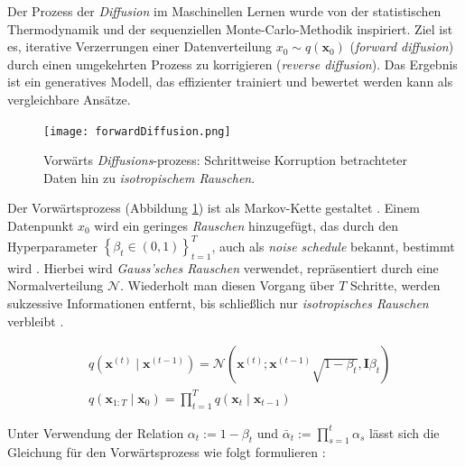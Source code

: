\documentclass[
  a4paper,  %
  twoside,  %
  bibliography=totoc,
  headsepline,
  cleardoublepage=empty,
  parskip=half,
  draft=false
]{scrbook}
\begin{document}
Der Prozess der \emph{Diffusion} im Maschinellen Lernen \cite{sohl-dickstein_deep_2015, ho_denoising_2020, nichol_improved_2021, dhariwal_diffusion_2021} wurde von der statistischen Thermodynamik \cite{jarzynski_equilibrium_1997} und der sequenziellen Monte-Carlo-Methodik \cite{neal_annealed_1998} inspiriert. Ziel ist es, iterative Verzerrungen einer Datenverteilung $x_0\sim q(\mathbf{x}_0)$ (\emph{forward diffusion}) durch einen umgekehrten Prozess zu korrigieren (\emph{reverse diffusion}). Das Ergebnis ist ein generatives Modell, das effizienter trainiert und bewertet werden kann als vergleichbare Ansätze. \cite{sohl-dickstein_deep_2015, nichol_improved_2021}

\begin{figure}[h]
  \centering
  \texttt{[image: forwardDiffusion.png]}
  \caption[Vorwärtsprozess Diffusion]{Vorwärts \emph{Diffusions}-prozess: Schrittweise Korruption betrachteter Daten hin zu \emph{isotropischem Rauschen}. \cite{machine_learning_at_berkeley_diffusion_2022}}
  \label{fig:forwardDiffusion}
\end{figure} 

Der Vorwärtsprozess (Abbildung \ref{fig:forwardDiffusion}) ist als Markov-Kette gestaltet \cite{sohl-dickstein_deep_2015, ho_denoising_2020}. Einem Datenpunkt $x_0$ wird ein geringes \emph{Rauschen} hinzugefügt, das durch den Hyperparameter $\left\{\beta_t \in(0,1)\right\}_{t=1}^T$, auch als \emph{noise schedule} bekannt, bestimmt wird \cite{ho_denoising_2020, machine_learning_at_berkeley_diffusion_2022}. Hierbei wird \emph{Gauss'sches Rauschen} \cite{shannon_communication_1949} verwendet, repräsentiert durch eine Normalverteilung $\mathcal{N}$. Wiederholt man diesen Vorgang über $T$ Schritte, werden sukzessive Informationen entfernt, bis schließlich nur \emph{isotropisches Rauschen} verbleibt \cite{machine_learning_at_berkeley_diffusion_2022}.

\begin{align}
   & q\left(\mathbf{x}^{(t)} \mid \mathbf{x}^{(t-1)}\right) = \mathcal{N}\left(\mathbf{x}^{(t)} ; \mathbf{x}^{(t-1)} \sqrt{1-\beta_t}, \mathbf{I} \beta_t\right) \\
   & q\left(\mathbf{x}_{1: T} \mid \mathbf{x}_0\right)=\prod_{t=1}^T q\left(\mathbf{x}_t \mid \mathbf{x}_{t-1}\right)
\end{align}

Unter Verwendung der Relation \( \alpha_t:=1-\beta_t \) und \( \bar{\alpha}_t:=\prod_{s=1}^t \alpha_s \) lässt sich die Gleichung für den Vorwärtsprozess wie folgt formulieren \cite{ho_denoising_2020}: 
\end{document}
